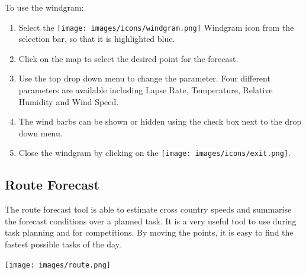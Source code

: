 \documentclass[11pt,a4paper]{article}
\begin{document}
To use the windgram:
\begin{enumerate}
\item Select the \texttt{[image: images/icons/windgram.png]} Windgram icon from the selection bar, so that it is highlighted blue.
\item Click on the map to select the desired point for the forecast.
\item Use the top drop down menu to change the parameter. Four different parameters are available including Lapse Rate, Temperature, Relative Humidity and Wind Speed.
\item The wind barbs can be shown or hidden using the check box next to the drop down menu.
\item Close the windgram by clicking on the \texttt{[image: images/icons/exit.png]}.
\end{enumerate}

\subsection{Route Forecast}\label{subsec:routeforecast}
The route forecast tool is able to estimate cross country speeds and summarise the forecast conditions over a planned task. It is a very useful tool to use during task planning and for competitions. By moving the points, it is easy to find the fastest possible tasks of the day.
\begin{center}
\texttt{[image: images/route.png]}
\end{center}
\end{document}
